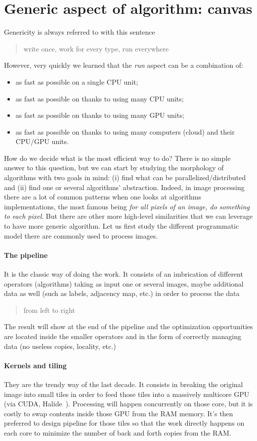 \section{Generic aspect of algorithm: canvas}
\label{sec:canvas}

Genericity is always referred to with this sentence \blockquote{write once, work for every type, run everywhere}.
However, very quickly we learned that the \emph{run} aspect can be a combination of:
\begin{itemize}
  \item as fast as possible on a single CPU unit;
  \item as fast as possible on thanks to using many CPU units;
  \item as fast as possible on thanks to using many GPU units;
  \item as fast as possible on thanks to using many computers (cloud) and their CPU/GPU units.
\end{itemize}
How do we decide what is the most efficient way to do? There is no simple answer to this question, but we can start by
studying the morphology of algorithms with two goals in mind: (i) find what can be parallelized/distributed and (ii)
find one or several algorithms' abstraction. Indeed, in image processing there are a lot of common patterns when one
looks at algorithms implementations, the most famous being \emph{for all pixels of an image, do something to each
  pixel}. But there are other more high-level similarities that we can leverage to have more generic algorithm. Let us
first study the different programmatic model there are commonly used to process images.


\paragraph{The pipeline} It is the classic way of doing the work. It consists of an imbrication of different operators
(algorithms) taking as input one or several images, maybe additional data as well (such as labels, adjacency map, etc.)
in order to process the data \blockquote{from left to right}. The result will show at the end of the pipeline and the
optimization opportunities are located inside the smaller operators and in the form of correctly managing data (no
useless copies, locality, etc.)

\paragraph{Kernels and tiling} They are the trendy way of the last decade. It consists in breaking the original image
into small tiles in order to feed those tiles into a massively multicore GPU (via CUDA,
Halide~\parencite{ragankelley.2013.halide}). Processing will happen concurrently on those core, but it is costly to swap
contents inside those GPU from the RAM memory. It's then preferred to design pipeline for those tiles so that the work
directly happens on each core to minimize the number of back and forth copies from the RAM.

